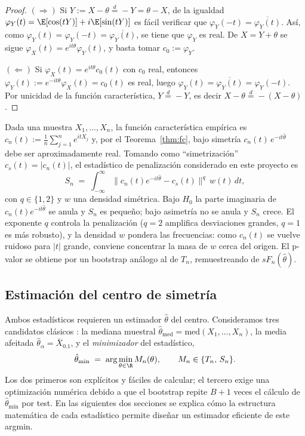 \begin{proof}
$(\Rightarrow)$ Si $Y:=X-\theta\overset{d}{=}-Y=\theta-X$, de la igualdad $\varphi_Y(t) = \E[\cos(tY)] + i\E[\sin(tY)]$ es fácil verificar que $\varphi_Y(-t)=\overline{\varphi_Y(t)}$. Así, como $\varphi_Y(t)=\varphi_Y(-t)=\overline{\varphi_Y(t)}$, se tiene que $\varphi_Y$ es real. De $X=Y+\theta$ se sigue $\varphi_X(t)=e^{it\theta}\varphi_Y(t)$, y basta tomar $c_0:=\varphi_Y$.

$(\Leftarrow)$ Si $\varphi_X(t)=e^{it\theta}c_0(t)$ con $c_0$ real, entonces $\varphi_Y(t):=e^{-it\theta}\varphi_X(t)=c_0(t)$ es real, luego $\varphi_Y(t)=\overline{\varphi_Y(t)}=\varphi_Y(-t)$. Por unicidad de la función característica, $Y\overset{d}{=}-Y$, es decir $X-\theta\overset{d}{=}-(X-\theta)$.
\end{proof}

Dada una muestra $X_1,\dots,X_n$, la función característica empírica es $c_n(t):=\frac{1}{n}\sum_{j=1}^{n}e^{itX_j}$ y, por el Teorema~\ref{thm:fc}, bajo simetría $c_n(t)\,e^{-it\hat\theta}$ debe ser aproximadamente real. Tomando como ``simetrización'' $c_s(t)=|c_n(t)|$, el estadístico de penalización considerado en este proyecto es
\begin{equation}\label{eq:Sn}
S_n \;=\; \int_{-\infty}^{\infty}\bigl\|c_n(t)e^{-it\hat\theta}-c_s(t)\bigr\|^q\,w(t)\,dt,
\end{equation}
con $q\in\{1,2\}$ y $w$ una densidad simétrica. Bajo $H_0$ la parte imaginaria de $c_n(t)e^{-it\hat\theta}$ se anula y $S_n$ es pequeño; bajo asimetría no se anula y $S_n$ crece. El exponente $q$ controla la penalización ($q{=}2$ amplifica desviaciones grandes, $q{=}1$ es más robusto), y la densidad $w$ pondera las frecuencias: como $c_n(t)$ se vuelve ruidoso para $|t|$ grande, conviene concentrar la masa de $w$ cerca del origen. El p-valor se obtiene por un bootstrap análogo al de $T_n$, remuestreando de $sF_n(\hat\theta)$.

\subsection{Estimación del centro de simetría}\label{sec:estim-theta}

Ambos estadísticos requieren un estimador $\hat\theta$ del centro. Consideramos tres candidatos clásicos \cite{schuster1987bootstrap}: la mediana muestral $\hat\theta_{\mathrm{med}}=\mathrm{med}(X_1,\dots,X_n)$, la media afeitada $\hat\theta_\alpha=\bar X_{0.1}$, y el \emph{minimizador} del estadístico,
\[
\hat\theta_{\min} \;=\; \arg\min_{\theta\in\R} M_n(\theta),
\qquad M_n\in\{T_n,\,S_n\}.
\]
Los dos primeros son explícitos y fáciles de calcular; el tercero exige una optimización numérica debido a que el bootstrap repite $B{+}1$ veces el cálculo de $\hat\theta_{\min}$ por test. En las siguientes dos secciones se explica cómo la estructura matemática de cada estadístico permite diseñar un  estimador eficiente de este argmin.

